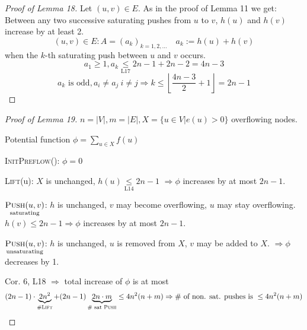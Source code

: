 \documentclass[12pt,oneside,a4paper,parskip=on,fleqn]{scrartcl}
\begin{document}
	\begin{proof}[Proof of Lemma 18]
		Let $(u,v)\in E$. As in the proof of Lemma 11 we get:
		Between any two successive saturating pushes from $u$ to $v$, $h(u)$ and $h(v)$ increase by at least 2.
		\[
			(u,v)\in E: A = \left( a_k \right)_{k=1,2,\ldots}\quad a_k := h(u) + h(v) 
		\]
		when the $k$-th saturating push between $u$ and $v$ occurs.
		\[
			a_1 \geq 1, a_k\underset{\text{L17}}\leq 2n-1 + 2n-2 = 4n-3
		\]
		\[
			a_k \text{ is odd}, a_i \neq a_j\ i\neq j \Rightarrow k \leq \left\lfloor\frac{4n-3}{2} + 1 \right\rfloor= 2n-1
		\]
		\end{proof}
	\begin{proof}[Proof of Lemma 19]
		$n=|V|, m=|E|, X = \{u\in V| e(u) > 0\}$ overflowing nodes.

		Potential function $\phi = \sum_{u\in X} f(u)$

		\textsc{InitPreflow}(): $\phi = 0$

		\textsc{Lift}(u): $X$ is unchanged, $h(u) \underset{\text{L14}}{\leq} 2n-1$
			$\Rightarrow \phi$ increases by at most $2n-1$.

		$\underset{\text{saturating}}{\textsc{Push}(u,v)}$: $h$ is unchanged, $v$ may become overflowing, $u$ may stay overflowing.
		$h(v) \leq 2n-1 \Rightarrow \phi$ increases by at most $2n-1$.

		$\underset{\text{unsaturating}}{\textsc{Push}(u,v)}$: $h$ is unchanged, $u$ is removed from $X$, $v$ may be added to $X$. $\Rightarrow \phi$ decreases by 1.

		Cor. 6, L18 $\Rightarrow$ total increase of $\phi$ is at most
		\[
			(2n-1)\cdot \underbrace{2n^2}_{\textsc{\#Lift}} + (2n-1) \underbrace{2n\cdot m}_{\text{\# sat }\textsc{Push}} \leq 4n^2 (n+m) \Rightarrow \text{\# of non. sat. pushes is } \leq 4n^2(n+m)
		\]
	\end{proof}
\end{document}
